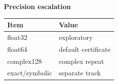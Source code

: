 \begin{center}
\textbf{Precision escalation}\par\smallskip
\begin{tabular}{ll}
\toprule
Item & Value \\
\midrule
float32 & exploratory \\
float64 & default certificate \\
complex128 & complex repeat \\
exact/symbolic & separate track \\
\bottomrule
\end{tabular}
\end{center}

